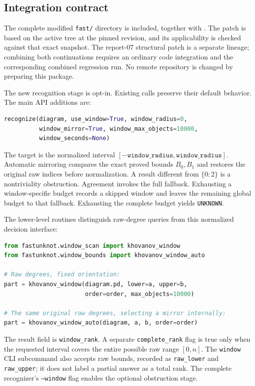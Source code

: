 \subsection{Integration contract}

The complete modified \texttt{fast/} directory is included, together with
.  The patch is based on the active
tree at the pinned revision, and its applicability is checked against that
exact snapshot.  The report-07 structural patch is a separate lineage;
combining both continuations requires an ordinary code integration and
the corresponding combined regression run.  No remote repository is
changed by preparing this package.

The new recognition stage is opt-in.  Existing calls preserve their
default behavior.  The main API additions are:
\begin{lstlisting}[language=Python]
recognize(diagram, use_window=True, window_radius=0,
          window_mirror=True, window_max_objects=10000,
          window_seconds=None)
\end{lstlisting}
The target is the normalized interval
$[-\texttt{window\_radius},\texttt{window\_radius}]$.
Automatic mirroring compares the exact proved bounds $B_0,B_1$ and
restores the original raw indices before normalization.  A result
different from $\{0:2\}$ is a nontriviality obstruction.  Agreement invokes
the full fallback.  Exhausting a window-specific budget records a skipped
window and leaves the remaining global budget to that fallback.  Exhausting
the complete budget yields \texttt{UNKNOWN}.

The lower-level routines distinguish raw-degree queries from this
normalized decision interface:
\begin{lstlisting}[language=Python]
from fastunknot.window_scan import khovanov_window
from fastunknot.window_bounds import khovanov_window_auto

# Raw degrees, fixed orientation:
part = khovanov_window(diagram.pd, lower=a, upper=b,
                       order=order, max_objects=10000)

# The same original raw degrees, selecting a mirror internally:
part = khovanov_window_auto(diagram, a, b, order=order)
\end{lstlisting}
The result field is \texttt{window\_rank}.  A separate
\texttt{complete\_rank} flag is true only when the requested interval
covers the entire possible raw range $[0,n]$.  The \texttt{window} CLI
subcommand also accepts raw bounds, recorded as \texttt{raw\_lower} and
\texttt{raw\_upper}; it does
not label a partial answer as a total rank.  The complete recognizer's
\texttt{--window} flag enables the optional obstruction stage.

